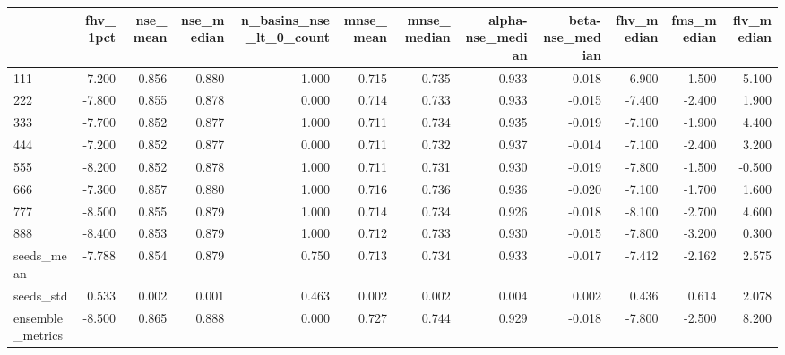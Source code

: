 \begin{tabular}{lrrrrrrrrrrr}
\toprule
 & fhv_1pct & nse_mean & nse_median & n_basins_nse_lt_0_count & mnse_mean & mnse_median & alpha-nse_median & beta-nse_median & fhv_median & fms_median & flv_median \\
\midrule
111 & -7.200 & 0.856 & 0.880 & 1.000 & 0.715 & 0.735 & 0.933 & -0.018 & -6.900 & -1.500 & 5.100 \\
222 & -7.800 & 0.855 & 0.878 & 0.000 & 0.714 & 0.733 & 0.933 & -0.015 & -7.400 & -2.400 & 1.900 \\
333 & -7.700 & 0.852 & 0.877 & 1.000 & 0.711 & 0.734 & 0.935 & -0.019 & -7.100 & -1.900 & 4.400 \\
444 & -7.200 & 0.852 & 0.877 & 0.000 & 0.711 & 0.732 & 0.937 & -0.014 & -7.100 & -2.400 & 3.200 \\
555 & -8.200 & 0.852 & 0.878 & 1.000 & 0.711 & 0.731 & 0.930 & -0.019 & -7.800 & -1.500 & -0.500 \\
666 & -7.300 & 0.857 & 0.880 & 1.000 & 0.716 & 0.736 & 0.936 & -0.020 & -7.100 & -1.700 & 1.600 \\
777 & -8.500 & 0.855 & 0.879 & 1.000 & 0.714 & 0.734 & 0.926 & -0.018 & -8.100 & -2.700 & 4.600 \\
888 & -8.400 & 0.853 & 0.879 & 1.000 & 0.712 & 0.733 & 0.930 & -0.015 & -7.800 & -3.200 & 0.300 \\
seeds_mean & -7.788 & 0.854 & 0.879 & 0.750 & 0.713 & 0.734 & 0.933 & -0.017 & -7.412 & -2.162 & 2.575 \\
seeds_std & 0.533 & 0.002 & 0.001 & 0.463 & 0.002 & 0.002 & 0.004 & 0.002 & 0.436 & 0.614 & 2.078 \\
ensemble_metrics & -8.500 & 0.865 & 0.888 & 0.000 & 0.727 & 0.744 & 0.929 & -0.018 & -7.800 & -2.500 & 8.200 \\
\bottomrule
\end{tabular}
